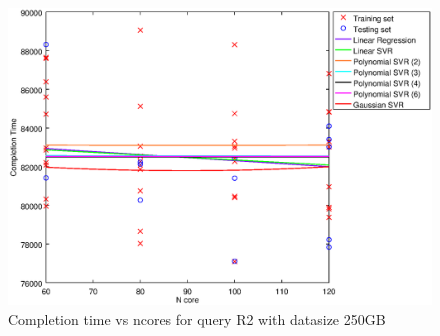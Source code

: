 
\begin {figure}[hbtp]
\centering
\includegraphics[width=\textwidth]{output/R2_250_LINEAR_NCORE/plot_R2_250.eps}
\caption{Completion time vs ncores for query R2 with datasize 250GB}
\label{fig:coreonly_linear_R2_250}
\end {figure}
